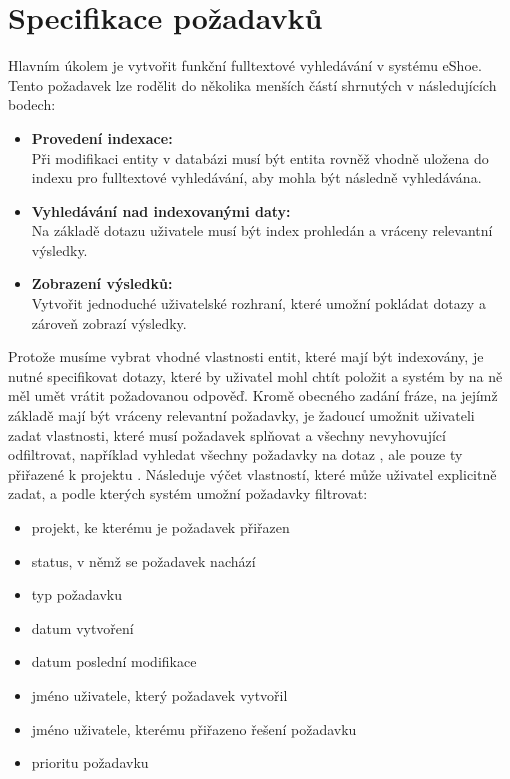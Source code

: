 \documentclass[11pt,oneside]{fithesis2}
\begin{document}
\section{Specifikace požadavků}
\label{SpecifikacePozadavku}
Hlavním úkolem je vytvořit funkční fulltextové vyhledávání v systému eShoe. Tento požadavek lze rodělit do několika menších částí shrnutých v následujících bodech:
\begin{itemize}
	\item \textbf{Provedení indexace:} \\ 
		 Při modifikaci entity v databázi musí být entita rovněž vhodně uložena do indexu pro fulltextové vyhledávání, aby mohla být následně vyhledávána.

	\item \textbf{Vyhledávání nad indexovanými daty:} \\
		Na základě dotazu uživatele musí být index prohledán a vráceny relevantní výsledky.

	\item \textbf{Zobrazení výsledků:} \\
		Vytvořit jednoduché uživatelské rozhraní, které umožní pokládat dotazy a zároveň zobrazí výsledky.		
\end{itemize}

Protože musíme vybrat vhodné vlastnosti entit, které mají být indexovány, je nutné specifikovat dotazy, které by uživatel mohl chtít položit a systém by na ně měl umět vrátit požadovanou odpověď. Kromě obecného zadání fráze, na jejímž základě mají být vráceny relevantní požadavky, je žadoucí umožnit uživateli zadat vlastnosti, které musí požadavek splňovat a všechny nevyhovující odfiltrovat, například vyhledat všechny požadavky na dotaz , ale pouze ty přiřazené k projektu . Následuje výčet vlastností, které může uživatel explicitně zadat, a podle kterých systém umožní požadavky filtrovat:
\begin{itemize}
	\item projekt, ke kterému je požadavek přiřazen
	\item status, v němž se požadavek nachází
	\item typ požadavku
	\item datum vytvoření
	\item datum poslední modifikace
	\item jméno uživatele, který požadavek vytvořil
	\item jméno uživatele, kterému přiřazeno řešení požadavku
	\item prioritu požadavku	 
\end{itemize}
\end{document}
